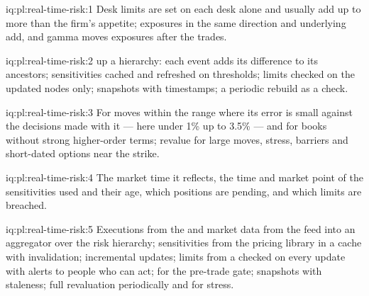 \begin{solution}{iq:pl:real-time-risk:1}
Desk limits are set on each desk alone and usually add up to more than the firm's appetite; exposures in the same direction and underlying
add, and gamma moves exposures after the trades.
\end{solution}

\begin{solution}{iq:pl:real-time-risk:2}
 up a hierarchy: each event adds its difference to its ancestors; sensitivities cached and refreshed on thresholds;
limits checked on the updated nodes only; snapshots with timestamps; a periodic rebuild as a check.
\end{solution}

\begin{solution}{iq:pl:real-time-risk:3}
For moves within the range where its error is small against the decisions made with it --- here under 1\% up to 3.5\% --- and for books without
strong higher-order terms; revalue for large moves, stress, barriers and short-dated options near the strike.
\end{solution}

\begin{solution}{iq:pl:real-time-risk:4}
The market time it reflects, the time and market point of the sensitivities used and their age, which positions are pending, and which limits
are breached.
\end{solution}

\begin{solution}{iq:pl:real-time-risk:5}
Executions from the  and market data from the feed into an aggregator over the risk hierarchy; sensitivities from the pricing
library in a cache with invalidation; incremental updates; limits from a  checked on every update with alerts to people who can
act;  for the pre-trade gate; snapshots with staleness; full revaluation periodically and for stress.
\end{solution}
